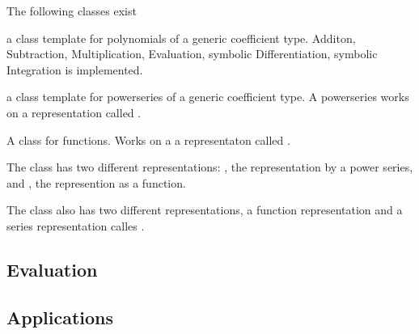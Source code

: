 		The following classes exist
		
		\textbf{\poly} a class template for polynomials of a generic coefficient type. 
		Additon, Subtraction, Multiplication, Evaluation, symbolic Differentiation, symbolic Integration is implemented.

		\textbf{\powerseries} a class template for powerseries of a generic coefficient type.
		A powerseries works on a representation called . 

		\textbf{\func} A class for functions. 
		Works on a a representaton called .

		The class \textbf{\baana} has two different representations: 
		, the representation by a power series, and , the represention as a function.

		The class \textbf{\anarect} also has two different representations, 
		a function representation  and a series representation calles .
	\subsection{Evaluation}
	\subsection{Applications}